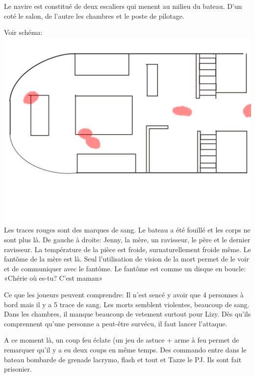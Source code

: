 \documentclass[oneside,12pt]{book}
\begin{document}
\begin{flushleft}
Le navire est constitué de deux escaliers qui menent au milieu du bateau. D'un coté le salon, de l'autre les chambres et le poste de pilotage.

Voir schéma:
\includegraphics[scale=0.5]{bateau.png} \\
Les traces rouges sont des marques de sang. Le bateau a été fouillé et les corps ne sont plus là. 
De gauche à droite: Jenny, la mère, un ravisseur, le père et le dernier ravisseur.
La température de la pièce est froide, surnaturellement froide même. Le fantôme de la mère est là. Seul l'utilisation de vision de la mort permet de le voir et de communiquer avec le fantôme.
Le fantôme est comme un disque en boucle:  «Chérie où es-tu? C'est maman»

Ce que les joueurs peuvent comprendre:
Il n'est sencé y avoir que 4 personnes à bord mais il y a 5 trace de sang. Les morts semblent violentes, beaucoup de sang. 
Dans les chambres, il manque beaucoup de vetement surtout pour Lizy. Dès qu'ils comprennent qu'une personne a peut-être survécu, il faut lancer l'attaque. 

A ce moment là, un coup feu éclate (un jeu de astuce + arme à feu permet de remarquer qu'il y a eu deux coups en même temps. Des commando entre dans le bateau bombarde de grenade lacrymo, flash et tout et Tazze le PJ. 
Ils sont fait prisonier. 



\end{flushleft}
\end{document}
